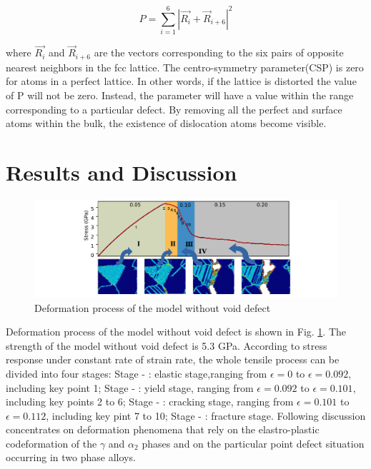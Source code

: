 \documentclass[metals,article,submit,moreauthors,pdftex,10pt,a4paper]{Definitions/mdpi}
\begin{document}
	\begin{equation} \label{eq:csp} 
	P = \displaystyle\sum_{i=1}^{6}|\vec{R_i}+{\vec{R}}_{i+6}|^2
	\end{equation}
	
where $\vec{R_i}$ and ${\vec{R}}_{i+6}$ are the vectors corresponding to the six pairs of opposite nearest neighbors in the fcc lattice. The centro-symmetry parameter(CSP) is zero for atoms in a perfect lattice. In other words, if the lattice is distorted the value of P will not be zero. Instead, the parameter will have a value within the range corresponding to a particular defect. By removing all the perfect and surface atoms within the bulk, the existence of dislocation atoms become visible. 
 
\section{Results and Discussion}\label{section:RD}

\begin{figure}[ht]
	\centering
	\includegraphics[width=1\linewidth]{img/perfect-line2-2}
	\caption{Deformation process of the model without void defect}
	\label{fig:deformation-pf}
\end{figure}


Deformation process of the model without void defect is shown in Fig. \ref{fig:deformation-pf}. The strength of the model without void defect is 5.3 GPa. According to stress response under constant rate of strain rate, the whole tensile process can be divided into four stages: 
Stage - \uppercase\expandafter{}: elastic stage,ranging from $\epsilon = 0$ to $\epsilon = 0.092$, including key point 1;
Stage - \uppercase\expandafter{}: yield stage, ranging from $\epsilon = 0.092$ to $\epsilon = 0.101$, including key points 2 to 6;
Stage - \uppercase\expandafter{}: cracking stage, ranging from $\epsilon = 0.101$ to $\epsilon = 0.112$, including key pint 7 to 10;
Stage - \uppercase\expandafter{}: fracture stage. Following discussion concentrates on deformation phenomena that rely on the elastro-plastic codeformation of the $\gamma$ and $\alpha_2$ phases and on the particular point defect situation occurring in two phase alloys. 
\end{document}
